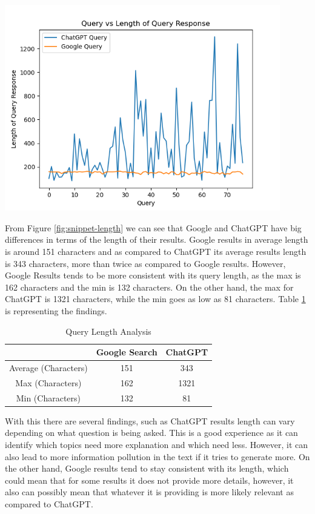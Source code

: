 \documentclass[50pt]{usiinfbachelorproject}
\begin{document}
\noindent
\begin{minipage}{\linewidth}
\centering
\includegraphics[width=0.9\textwidth]{images/length-of-snippet.png}
\label{fig:snippet-length}
\end{minipage}

From Figure \ref{fig:snippet-length} we can see that Google and ChatGPT have big differences in terms of the length of their results. Google results in average length is around 151 characters and as compared to ChatGPT its average results length is 343 characters, more than twice as compared to Google results. However, Google Results tends to be more consistent with its query length, as the max is 162 characters and the min is 132 characters. On the other hand, the max for ChatGPT is 1321 characters, while the min goes as low as 81 characters. Table \ref{table:query-length-analysis} is representing the findings.

\begin{table}[H]
  \centering
  \begin{tabular}{|c|c|c|}
    \hline
    & Google Search & ChatGPT \\
    \hline
    \hline
    Average (Characters) & 151 & 343 \\
    \hline
    Max (Characters) & 162 & 1321 \\
    \hline
    Min (Characters) & 132 & 81 \\
    \hline
  \end{tabular}
  \caption{Query Length Analysis}
  \label{table:query-length-analysis}
\end{table}

With this there are several findings, such as ChatGPT results length can vary depending on what question is being asked. This is a good experience as it can identify which topics need more explanation and which need less. However, it can also lead to more information pollution in the text if it tries to generate more. On the other hand, Google results tend to stay consistent with its length, which could mean that for some results it does not provide more details, however, it also can possibly mean that whatever it is providing is more likely relevant as compared to ChatGPT.
\end{document}
